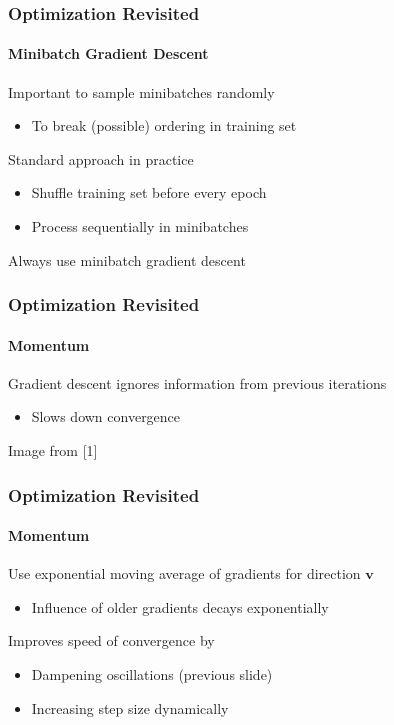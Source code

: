 \documentclass[xetex,professionalfont]{beamer}
\renewcommand{\vec}[1]{\ensuremath{\mathbf{#1}}}
\newcommand{\vv}{\vec{v}}
\begin{document}
\begin{frame}
\frametitle{Optimization Revisited}
\framesubtitle{Minibatch Gradient Descent}

Important to sample minibatches randomly
\begin{itemize}
    \item To break (possible) ordering in training set
\end{itemize}

\bigskip

Standard approach in practice
\begin{itemize}
    \item Shuffle training set before every epoch
    \item Process sequentially in minibatches
\end{itemize}

\bigskip

Always use minibatch gradient descent

\end{frame}


\begin{frame}
\frametitle{Optimization Revisited}
\framesubtitle{Momentum}

Gradient descent ignores information from previous iterations
\begin{itemize}
    \item Slows down convergence %
\end{itemize}

\medskip

\begin{center}
{\centering Image from [1]}
\end{center}

\end{frame}


\begin{frame}
\frametitle{Optimization Revisited}
\framesubtitle{Momentum}

Use exponential moving average of gradients for direction $\vv$
\begin{itemize}
    \item Influence of older gradients decays exponentially
\end{itemize}

\bigskip

Improves speed of convergence by
\begin{itemize}
    \item Dampening oscillations (previous slide)
    \item Increasing step size dynamically
\end{itemize}

\end{frame}
\end{document}
